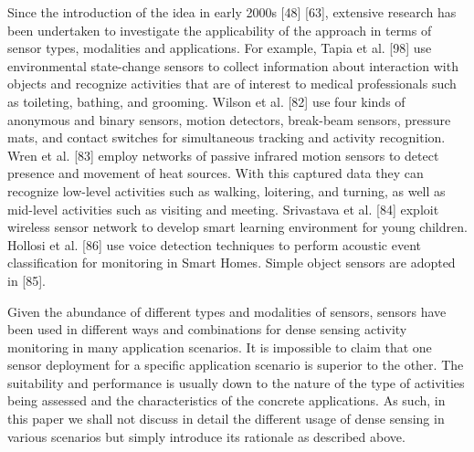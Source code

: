 Since the introduction of the idea in early 2000s [48] [63], extensive research has been undertaken to investigate the applicability of the approach in terms of sensor types, modalities and applications. For example, Tapia et al. [98] use environmental state-change sensors to collect information about interaction with objects and recognize activities that are of interest to medical professionals such as toileting, bathing, and grooming. Wilson et al. [82] use four kinds of anonymous and binary sensors, motion detectors, break-beam sensors, pressure mats, and contact switches for simultaneous tracking and activity recognition. Wren et al. [83] employ networks of passive infrared motion sensors to detect presence and movement of heat sources. With this captured data they can recognize low-level activities such as walking, loitering, and turning, as well as mid-level activities such as visiting and meeting. Srivastava et al. [84] exploit wireless sensor network to develop smart learning environment for young children. Hollosi et al. [86] use voice detection techniques to perform acoustic event classification for monitoring in Smart Homes. Simple object sensors are adopted in [85].

Given the abundance of different types and modalities of sensors, sensors have been used in different ways and combinations for dense sensing activity monitoring in many application scenarios. It is impossible to claim that one sensor deployment for a specific application scenario is superior to the other. The suitability and performance is usually down to the nature of the type of activities being assessed and the characteristics of the concrete applications. As such, in this paper we shall not discuss in detail the different usage of dense sensing in various scenarios but simply introduce its rationale as described above.

